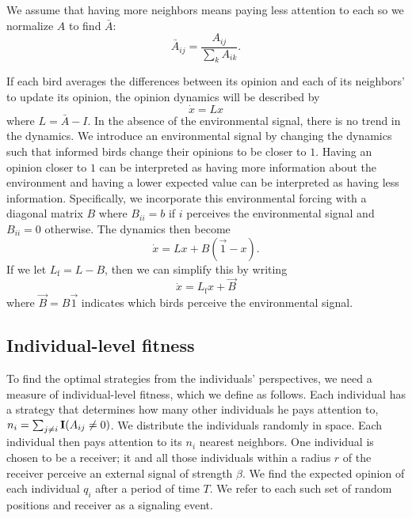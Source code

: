 \documentclass{article}
\begin{document}
We assume that having more neighbors means paying less attention to each so we normalize $A$ to find $\bar{A}$:
\begin{equation}
\bar{A}_{ij}=\frac{A_{ij}}{\sum_kA_{ik}}.
\end{equation}

If each bird averages the differences between its opinion and each of its neighbors' to update its opinion, the opinion dynamics will be described by 
\begin{equation}
\dot{x}=Lx
\end{equation}
where $L=\bar{A}-I$. In the absence of the environmental signal, there is no trend in the dynamics. We introduce an environmental signal by changing the dynamics such that informed birds change their opinions to be closer to $1$. Having an opinion closer to $1$ can be interpreted as having more information about the environment and having a lower expected value can be interpreted as having less information. Specifically, we incorporate this environmental forcing with a diagonal matrix $B$ where $B_{ii}=b$ if $i$ perceives the environmental signal and $B_{ii}=0$ otherwise. The dynamics then become
\begin{equation}
\dot{x}=Lx+B(\vec{1}-x).
\end{equation}
If we let $L_\text{f}=L-B$, then we can simplify this by writing
\begin{equation}
\dot{x}=L_\text{f}x+\vec{B}
\end{equation}
where $\vec{B}=B\vec{1}$ indicates which birds perceive the environmental signal.



\subsection{Individual-level fitness }
To find the optimal strategies from the individuals' perspectives, we need a measure of individual-level fitness, which we define as follows. Each individual has a strategy that determines how many other individuals he pays attention to, $n_i=\sum_{j\neq i}{\bf I}(A_{ij}\neq 0)$.  We distribute the individuals randomly in space.  Each individual then pays attention to its $n_i$ nearest neighbors.  One individual is chosen to be a receiver; it and all those individuals within a radius $r$ of the receiver perceive an external signal of strength $\beta$.  We find the expected opinion of each individual $q_i$ after a period of time $T$.  We refer to each such set of random positions and receiver as a signaling event. 
\end{document}
